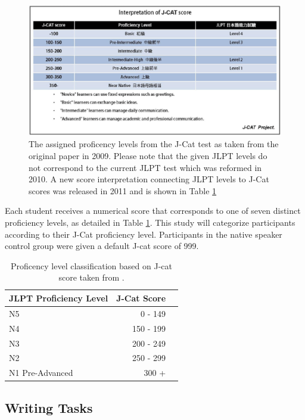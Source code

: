 \begin{figure}[h]
    \centering
    \includegraphics[scale=.3]{img/JCatScores.png}
    \caption[J-Cat Proficency Levels]{The assigned proficency levels from the J-Cat test as taken from the original paper in  2009. Please note that the given JLPT levels do not correspond to the current JLPT test which was reformed in 2010. A new score interpretation connecting JLPT levels to J-Cat scores was released in 2011 and is shown in Table \ref{tab:proficency-table} }
    \label{fig:JCatLevels}
\end{figure}

Each student receives a numerical score that corresponds to one of seven distinct proficiency levels, as detailed in
Table \ref{tab:proficency-table}. This study will categorize participants according to their J-Cat proficiency level. Participants in the
native speaker control group were given a default J-cat score of 999.

\begin{table}
\centering
\begin{tabular}{lrl}
\hline \textbf{JLPT Proficiency Level} & \textbf{J-Cat Score}  \\ \hline
N5 & 0 - 149 \\
N4 & 150 - 199 \\
N3 & 200 - 249 \\
N2 & 250 - 299 \\
N1 Pre-Advanced & 300 + \\
\hline
\end{tabular}
\caption[Proficency Levels]{Proficency level classification based on J-cat score taken from \cite{jcat_interpretation_guide}.}
\label{tab:proficency-table}
\end{table}

\subsection{Writing Tasks}

